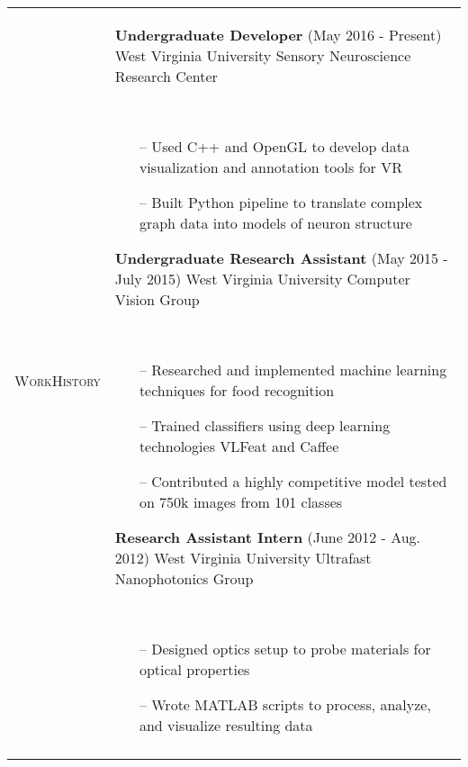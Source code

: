 \documentclass{article}
\begin{document}
\begin{tabular}{@{}p{2.5cm}@{\hspace{0.2cm}}p{13cm}@{}}
    \enspace\textsc{Work}\newline\textsc{History} &
    \enspace\textbf{Undergraduate Developer}
    \hfill\small(May 2016 - Present)\normalsize
    \newline West Virginia University Sensory Neuroscience Research Center
    \par\,\small
        \begin{itemize}[leftmargin=*,nolistsep,noitemsep]
        \item[--]Used C++ and OpenGL to develop data visualization and annotation tools for VR
        \item[--]Built Python pipeline to translate complex graph data into models of neuron structure
        \newline
        \end{itemize}
    \normalsize
    \enspace\textbf{Undergraduate Research Assistant}
    \hfill\small(May 2015 - July 2015)\normalsize
    \newline West Virginia University Computer Vision Group
    \par\,\small
        \begin{itemize}[leftmargin=*,nolistsep,noitemsep]
        \item[--]Researched and implemented machine learning techniques for food recognition
        \item[--]Trained classifiers using deep learning technologies VLFeat and Caffee
        \item[--]Contributed a highly competitive model tested on 750k images from 101 classes
        \newline
        \end{itemize}
    \normalsize
    \textbf{Research Assistant Intern}
    \hfill\small(June 2012 - Aug. 2012)\normalsize
    \newline West Virginia University Ultrafast Nanophotonics Group
    \par\,\small
      \begin{itemize}[leftmargin=*,nolistsep,noitemsep]
      \item[--]Designed optics setup to probe materials for optical properties
      \item[--]Wrote MATLAB scripts to process, analyze, and visualize resulting data
      \end{itemize}\\
    \normalsize


\end{tabular}
\end{document}
